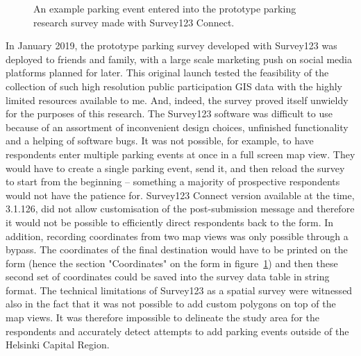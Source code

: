 \begin{figure}[H]%
    \centering
    \quad
    \quad
    \caption[The unused prototype parking survey created with Survey123]{An example parking event entered into the prototype parking research survey made with Survey123 Connect.}%
    \label{fig:survey123}%
\end{figure}

In January 2019, the prototype parking survey developed with Survey123 was deployed to friends and family, with a large scale marketing push on social media platforms planned for later. This original launch tested the feasibility of the collection of such high resolution public participation GIS data with the highly limited resources available to me. And, indeed, the survey proved itself unwieldy for the purposes of this research. The Survey123 software was difficult to use because of an assortment of inconvenient design choices, unfinished functionality and a helping of software bugs. It was not possible, for example, to have respondents enter multiple parking events at once in a full screen map view. They would have to create a single parking event, send it, and then reload the survey to start from the beginning -- something a majority of prospective respondents would not have the patience for. Survey123 Connect version available at the time, 3.1.126, did not allow customisation of the post-submission message and therefore it would not be possible to efficiently direct respondents back to the form. In addition, recording coordinates from two map views was only possible through a bypass. The coordinates of the final destination would have to be printed on the form (hence the section "Coordinates" on the form in figure~\ref{fig:survey123}) and then these second set of coordinates could be saved into the survey data table in string format. The technical limitations of Survey123 as a spatial survey were witnessed also in the fact that it was not possible to add custom polygons on top of the map views. It was therefore impossible to delineate the study area for the respondents and accurately detect attempts to add parking events outside of the Helsinki Capital Region.


